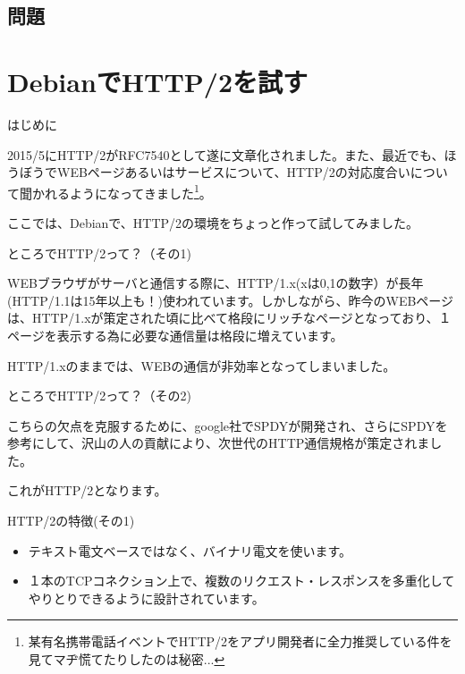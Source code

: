 \subsection{問題}



\section{DebianでHTTP/2を試す}

\begin{frame}{はじめに}

 2015/5にHTTP/2がRFC7540として遂に文章化されました。また、最近でも、ほうぼうでWEBページあるいはサービスについて、HTTP/2の対応度合いについて聞かれるようになってきました\footnote{某有名携帯電話イベントでHTTP/2をアプリ開発者に全力推奨している件を見てマヂ慌てたりしたのは秘密...}。

 ここでは、Debianで、HTTP/2の環境をちょっと作って試してみました。

\end{frame}

\begin{frame}{ところでHTTP/2って？（その1)}

  WEBブラウザがサーバと通信する際に、HTTP/1.x(xは0,1の数字）が長年(HTTP/1.1は15年以上も！)使われています。しかしながら、昨今のWEBページは、HTTP/1.xが策定された頃に比べて格段にリッチなページとなっており、１ページを表示する為に必要な通信量は格段に増えています。

\begin{center}
{\Large HTTP/1.xのままでは、WEBの通信が非効率となってしまいました。}
\end{center}

\end{frame}

\begin{frame}{ところでHTTP/2って？（その2)}

  こちらの欠点を克服するために、google社でSPDYが開発され、さらにSPDYを参考にして、沢山の人の貢献により、次世代のHTTP通信規格が策定されました。

\begin{center}
{\Large これがHTTP/2となります。}
\end{center}
    
\end{frame}   

\begin{frame}{HTTP/2の特徴(その1)}

 \begin{itemize}
 \item テキスト電文ベースではなく、バイナリ電文を使います。
 \item １本のTCPコネクション上で、複数のリクエスト・レスポンスを多重化してやりとりできるように設計されています。
\end{itemize}
   
\end{frame}

